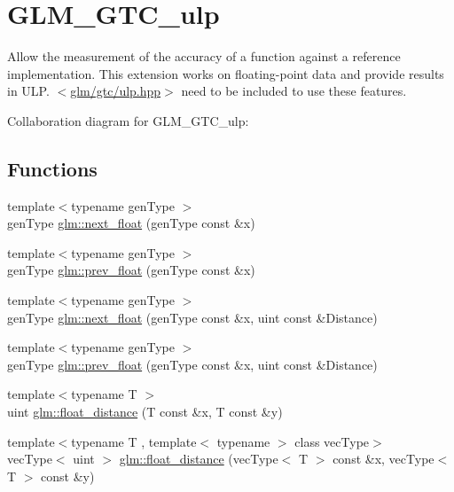 \hypertarget{group__gtc__ulp}{}\section{G\+L\+M\+\_\+\+G\+T\+C\+\_\+ulp}
\label{group__gtc__ulp}


Allow the measurement of the accuracy of a function against a reference implementation. This extension works on floating-\/point data and provide results in U\+L\+P. $<$\hyperlink{gtc_2ulp_8hpp}{glm/gtc/ulp.\+hpp}$>$ need to be included to use these features.  


Collaboration diagram for G\+L\+M\+\_\+\+G\+T\+C\+\_\+ulp\+:
\subsection*{Functions}
\begin{DoxyCompactItemize}
\item 
{\footnotesize template$<$typename gen\+Type $>$ }\\gen\+Type \hyperlink{group__gtc__ulp_ga3be6de2d954fb457ff88085128e4b521}{glm\+::next\+\_\+float} (gen\+Type const \&x)
\item 
{\footnotesize template$<$typename gen\+Type $>$ }\\gen\+Type \hyperlink{group__gtc__ulp_ga2a0122b31c643ca1546635fe8e4f9f74}{glm\+::prev\+\_\+float} (gen\+Type const \&x)
\item 
{\footnotesize template$<$typename gen\+Type $>$ }\\gen\+Type \hyperlink{group__gtc__ulp_ga27752f3f7a9a79a50e95a9ed42800ca7}{glm\+::next\+\_\+float} (gen\+Type const \&x, uint const \&Distance)
\item 
{\footnotesize template$<$typename gen\+Type $>$ }\\gen\+Type \hyperlink{group__gtc__ulp_gae506d2fb08aff01e00763d7ed76fe117}{glm\+::prev\+\_\+float} (gen\+Type const \&x, uint const \&Distance)
\item 
{\footnotesize template$<$typename T $>$ }\\uint \hyperlink{group__gtc__ulp_ga0c49c371f6b2adf02d03661e0f2499c9}{glm\+::float\+\_\+distance} (T const \&x, T const \&y)
\item 
{\footnotesize template$<$typename T , template$<$ typename $>$ class vec\+Type$>$ }\\vec\+Type$<$ uint $>$ \hyperlink{group__gtc__ulp_ga9b2de9eb54e59f20b20f7eccd40d435e}{glm\+::float\+\_\+distance} (vec\+Type$<$ T $>$ const \&x, vec\+Type$<$ T $>$ const \&y)
\end{DoxyCompactItemize}


